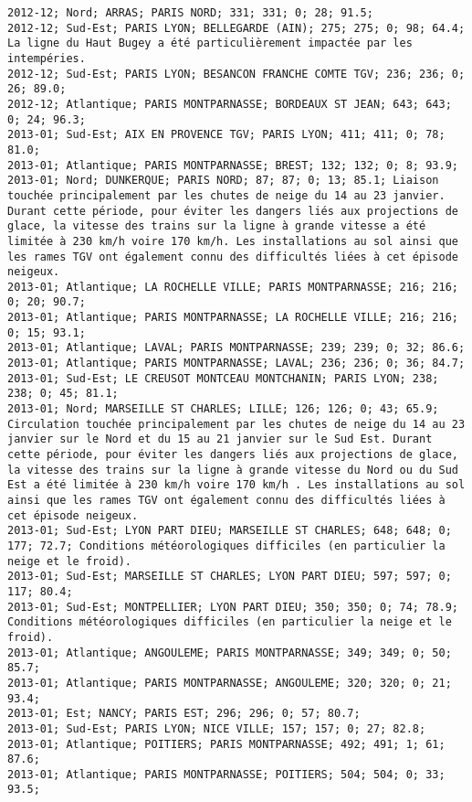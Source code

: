 \documentclass{article}
\begin{document}
\begin{Verbatim}[commandchars=\\\{\}]
2012-12; Nord; ARRAS; PARIS NORD; 331; 331; 0; 28; 91.5; 
2012-12; Sud-Est; PARIS LYON; BELLEGARDE (AIN); 275; 275; 0; 98; 64.4; La ligne du Haut Bugey a été particulièrement impactée par les intempéries.
2012-12; Sud-Est; PARIS LYON; BESANCON FRANCHE COMTE TGV; 236; 236; 0; 26; 89.0; 
2012-12; Atlantique; PARIS MONTPARNASSE; BORDEAUX ST JEAN; 643; 643; 0; 24; 96.3; 
2013-01; Sud-Est; AIX EN PROVENCE TGV; PARIS LYON; 411; 411; 0; 78; 81.0; 
2013-01; Atlantique; PARIS MONTPARNASSE; BREST; 132; 132; 0; 8; 93.9; 
2013-01; Nord; DUNKERQUE; PARIS NORD; 87; 87; 0; 13; 85.1; Liaison touchée principalement par les chutes de neige du 14 au 23 janvier. Durant cette période, pour éviter les dangers liés aux projections de glace, la vitesse des trains sur la ligne à grande vitesse a été limitée à 230 km/h voire 170 km/h. Les installations au sol ainsi que les rames TGV ont également connu des difficultés liées à cet épisode neigeux.
2013-01; Atlantique; LA ROCHELLE VILLE; PARIS MONTPARNASSE; 216; 216; 0; 20; 90.7; 
2013-01; Atlantique; PARIS MONTPARNASSE; LA ROCHELLE VILLE; 216; 216; 0; 15; 93.1; 
2013-01; Atlantique; LAVAL; PARIS MONTPARNASSE; 239; 239; 0; 32; 86.6; 
2013-01; Atlantique; PARIS MONTPARNASSE; LAVAL; 236; 236; 0; 36; 84.7; 
2013-01; Sud-Est; LE CREUSOT MONTCEAU MONTCHANIN; PARIS LYON; 238; 238; 0; 45; 81.1; 
2013-01; Nord; MARSEILLE ST CHARLES; LILLE; 126; 126; 0; 43; 65.9; Circulation touchée principalement par les chutes de neige du 14 au 23 janvier sur le Nord et du 15 au 21 janvier sur le Sud Est. Durant cette période, pour éviter les dangers liés aux projections de glace, la vitesse des trains sur la ligne à grande vitesse du Nord ou du Sud Est a été limitée à 230 km/h voire 170 km/h . Les installations au sol ainsi que les rames TGV ont également connu des difficultés liées à cet épisode neigeux.
2013-01; Sud-Est; LYON PART DIEU; MARSEILLE ST CHARLES; 648; 648; 0; 177; 72.7; Conditions météorologiques difficiles (en particulier la neige et le froid).
2013-01; Sud-Est; MARSEILLE ST CHARLES; LYON PART DIEU; 597; 597; 0; 117; 80.4; 
2013-01; Sud-Est; MONTPELLIER; LYON PART DIEU; 350; 350; 0; 74; 78.9; Conditions météorologiques difficiles (en particulier la neige et le froid).
2013-01; Atlantique; ANGOULEME; PARIS MONTPARNASSE; 349; 349; 0; 50; 85.7; 
2013-01; Atlantique; PARIS MONTPARNASSE; ANGOULEME; 320; 320; 0; 21; 93.4; 
2013-01; Est; NANCY; PARIS EST; 296; 296; 0; 57; 80.7; 
2013-01; Sud-Est; PARIS LYON; NICE VILLE; 157; 157; 0; 27; 82.8; 
2013-01; Atlantique; POITIERS; PARIS MONTPARNASSE; 492; 491; 1; 61; 87.6; 
2013-01; Atlantique; PARIS MONTPARNASSE; POITIERS; 504; 504; 0; 33; 93.5; 

\end{Verbatim}
\end{document}
